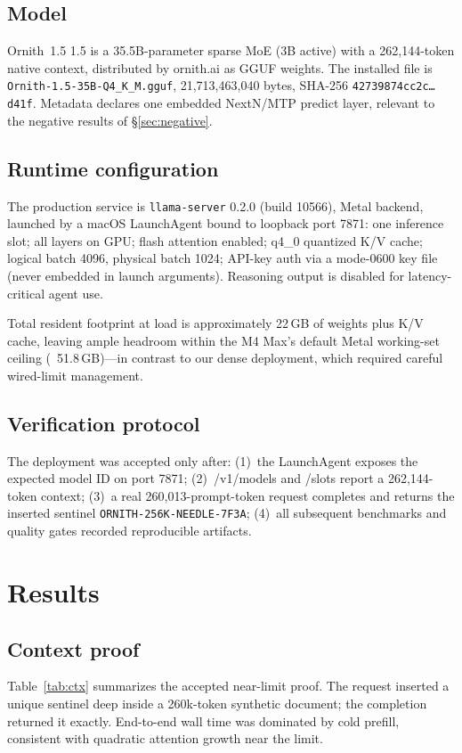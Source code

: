 \documentclass[11pt]{article}
\newcommand{\ornith}{Ornith~1.5}
\begin{document}
\subsection{Model}
\ornith{} 1.5 is a 35.5B-parameter sparse MoE (3B active) with a 262{,}144-token
native context, distributed by ornith.ai as GGUF weights. The installed file is
\texttt{Ornith-1.5-35B-Q4\_K\_M.gguf}, 21{,}713{,}463{,}040 bytes, SHA-256
\texttt{42739874cc2c\ldots d41f}. Metadata declares one embedded NextN/MTP
predict layer, relevant to the negative results of \S\ref{sec:negative}.

\subsection{Runtime configuration}
The production service is \texttt{llama-server} 0.2.0 (build 10566), Metal
backend, launched by a macOS LaunchAgent bound to loopback port 7871:
one inference slot; all layers on GPU; flash attention enabled; q4\_0
quantized K/V cache; logical batch 4096, physical batch 1024; API-key auth via
a mode-0600 key file (never embedded in launch arguments). Reasoning output
is disabled for latency-critical agent use.

Total resident footprint at load is approximately 22\,GB of weights plus
K/V cache, leaving ample headroom within the M4 Max's default Metal
working-set ceiling (~51.8\,GB)---in contrast to our dense deployment, which
required careful wired-limit management.

\subsection{Verification protocol}
The deployment was accepted only after: (1)~the LaunchAgent exposes the
expected model ID on port 7871; (2)~/v1/models and /slots report a
262{,}144-token context; (3)~a real 260{,}013-prompt-token request completes
and returns the inserted sentinel \texttt{ORNITH-256K-NEEDLE-7F3A}; (4)~all
subsequent benchmarks and quality gates recorded reproducible artifacts.

\section{Results}
\label{sec:perf}

\subsection{Context proof}
\label{sec:context}
Table~\ref{tab:ctx} summarizes the accepted near-limit proof. The request
inserted a unique sentinel deep inside a 260k-token synthetic document; the
completion returned it exactly. End-to-end wall time was dominated by cold
prefill, consistent with quadratic attention growth near the limit.
\end{document}
